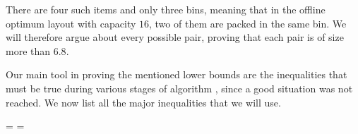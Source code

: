 There are four such items and only three bins, meaning that in the
offline optimum layout with capacity $16$, two of them are packed in
the same bin.  We will therefore argue about every possible pair,
proving that each pair is of size more than $6.8$.

Our main tool in proving the mentioned lower bounds are the
inequalities that must be true during various stages of algorithm
\tbalg, since a good situation was not reached. We now list
all the major inequalities that we will use.

\iffalse
\begin{align}
\label{eq:0}
s(A_{\before j}) &> 3 
& \mbox{Observation \ref{obs:1a}}\\
\label{eq:1}
s(B_{\before j}) + s(j) &> 6
& \mbox{Beginning of Step~\step{qstep}}\\
\label{eq:2}
s(A_{\before i}) + s(i) &> 6 
& \mbox{\gs2 not reached in Step~\step{qstep}}\\
\label{eq:3}
s(B_{\before r})+ s(r) &> 9 + \frac{s(A_{\before r})}{2} 
& \mbox{$r$ does not fit into $B|_q$}\\
\label{eq:4}
\left(s(B_{\before r}) + s(r) \right) + s(A_{\before r}) &< 15 
& \mbox{No \gs4 if $r$ packed into $B$}\\
\label{eq:5}
\left(s(B_{\before x}) + s(x) \right) + s(r) &< 15 + \frac{s(A_{\before x})}{2} 
& \mbox{No \gs4 when $x$ packed into $B|_{22}$}\\
\label{eq:6}
\left(s(B_{\before x})+ s(x) \right) + s(A_{\before x}) &< 15 + \frac{s(r)}{2}
& \mbox{No \gs4 when $x$ packed into $B|_{22}$}\\
\label{eq:7}
9 + \frac{s(A_{\before x}) + s(r)}{2} & < s(B_{\before x}) + s(x) 
 & \mbox{$x$ does not fit into $B|_{q}$}\\
\label{eq:8}
s(B_{\before x}) + (4 - s(r))  & > s(A_{\before x}) + s(x) 
& \mbox{No \gs6 if $x$ packed into $A$}\\
\label{eq:8b}
s(A_{\before x}) + s(x) + \big(4 - s(r)\big) &> s(B_{\before x}) 
& \mbox{No \gs6 if $x$ packed into $A$}\\
\label{eq:9b}
s(B_{\before x}) + \big(4 - s(A_{\before x})\big)  & > s(r) + s(x) 
& \mbox{No \gs6 if $x$ packed into $C$}\\
\label{eq:9}
s(r) + s(x) + (4 - s(A_{\before x})) & > s(B_{\before x})
& \mbox{No \gs6 if $x$ packed into $C$}
\end{align}
\fi

\newdimen\ads
\newdimen\bds
\ads=\abovedisplayskip
\bds=\belowdisplayskip
\setlength{\abovedisplayskip}{3pt}
\setlength{\belowdisplayskip}{3pt}

